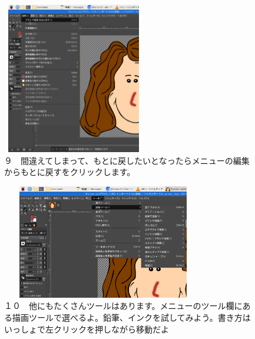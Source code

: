 \documentclass[a4paper,12pt]{jarticle}
\begin{document}
\begin{figure}[ht]
  \begin{minipage}{\textwidth}
    \begin{minipage}{6.984cm}
      \includegraphics[width=6.228cm,height=6.618cm]{textbook-img132.png}\\
      ９　間違えてしまって、もとに戻したいとなったらメニューの編集からもとに戻すをクリックします。
    \end{minipage}
    \hfill
    \begin{minipage}{8.966cm}
      \includegraphics[width=8.881cm,height=4.997cm]{textbook-img133.png}\\
      １０　他にもたくさんツールはあります。メニューのツール欄にある描画ツールで選べるよ。鉛筆、インクを試してみよう。書き方はいっしょで左クリックを押しながら移動だよ
    \end{minipage}
  \end{minipage}
\end{figure}

~
\end{document}
